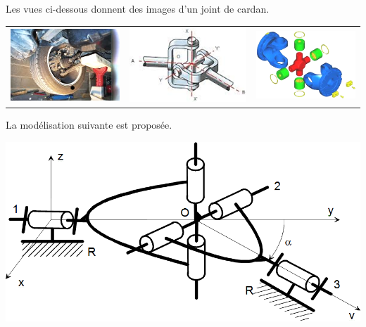 \documentclass[10pt,fleqn]{article} %
\begin{document}
\begin{multicols}{2}
Les vues ci-dessous donnent des images d’un joint de cardan.

\begin{center}
\begin{tabular}{ccc}
\includegraphics[width=.3\linewidth]{images/fig3_1} & 
\includegraphics[width=.3\linewidth]{images/fig3_2} & 
\includegraphics[width=.3\linewidth]{images/fig3_3} 
\end{tabular}
\end{center}

La modélisation suivante est proposée.
\begin{center}
\includegraphics[width=.95\linewidth]{images/fig3_4} 
\end{center}


\end{multicols}
\end{document}

